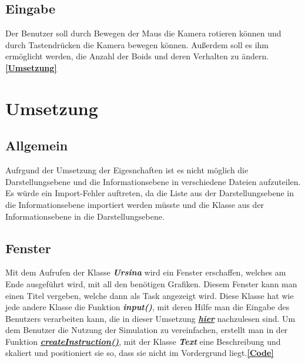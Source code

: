 \documentclass[a4paper, hidelinks, 12pt]{article}
\begin{document}
\subsection{Eingabe}
Der Benutzer soll durch Bewegen der Maus die Kamera rotieren können und durch Tastendrücken die Kamera bewegen können. Außerdem soll es ihm ermöglicht werden, die Anzahl der Boids und deren Verhalten zu ändern.\hyperref[Umsetzunginput]{\textbf{[Umsetzung]}}
\newpage
	
	
	
\section{Umsetzung}
\subsection{Allgemein}
Aufrgund der Umsetzung der Eigesnchaften ist es nicht möglich die Darstellungsebene und die Informationsebene in verschiedene Dateien aufzuteilen. Es würde ein Import-Fehler auftreten, da die Liste aus der Darstellungsebene in die Informationsebene importiert werden müsste und die Klasse aus der Informationsebene in die Darstellungsebene.
	
\subsection{Fenster}\label{UmsetzungFenster}
Mit dem Aufrufen der Klasse \textbf{\emph{Ursina}}\cite{2022m} wird ein Fenster erschaffen, welches am Ende ausgeführt wird, mit all den benötigen Grafiken\cite{2022q}. Diesem Fenster kann man einen Titel vergeben, welche dann als Task angezeigt wird\cite{2022q}. Diese Klasse hat wie jede andere Klasse\cite{2022} die Funktion \textbf{\emph{input()}}, mit deren Hilfe man die Eingabe des Benutzers verarbeiten kann, die in dieser Umsetzung \hyperref[Umsetzunginput]{\textbf{\emph{hier}}} nachzulesen sind. Um dem Benutzer die Nutzung der Simulation zu vereinfachen, erstellt man in der Funktion \hyperref[CodeCreateInstructions]{\textbf{\emph{createInstruction()}}}, mit der Klasse \textbf{\emph{Text}} eine Beschreibung und skaliert und positioniert sie so, dass sie nicht im Vordergrund liegt\cite{Takeru2022}.\hyperref[CodeFenster]{\textbf{[Code]}}
\end{document}
